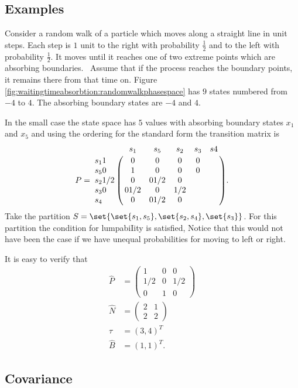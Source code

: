 \documentclass[12pt]{article}
\begin{document}
\subsection*{Examples}

\begin{example}
    Consider a random walk%
    of a particle which moves along a straight line in unit steps.  Each
    step is \( 1 \) unit to the right with probability \( \frac{1}{2} \) and to
    the left with probability \( \frac{1}{2} \).  It moves until it reaches
    one of two extreme points which are absorbing boundaries.~%
    Assume that if the process reaches the boundary points, it remains
    there from that time on.  Figure~%
    \ref{fig:waitingtimeabsorbtion:randomwalkphasespace} has \( 9 \)
    states numbered from \( -4 \) to \( 4 \).  The absorbing boundary
    states are \( -4 \) and \( 4 \).

    In the small case the state space has $5$ values with absorbing
    boundary states $x_1$ and $x_5$ and using the ordering for the
    standard form the transition matrix is
    \[
      P =
      \bordermatrix{
       & s_1 & s_5 & s_2 & s_3 & s4 \cr
      s_1 1 & 0 & 0 & 0 & 0 \cr
      s_5 0 & 1 & 0 & 0 & 0 \cr
      s_2 1/2 & 0 & 0 1/2 & 0 \cr
      s_3 0 & 0 1/2 & 0 & 1/2 \cr
      s_4   & 0 & 0 1/2 & 0 \cr
    }.
  \]
  Take the partition $S = \set{ \set{s_1, s_5}, \set{s_2, s_4},
    \set{s_3}}$.  For  this  partition 
the condition for lumpabiIity is  satisfied, Notice  that this would not 
have  been the case  if we  have  unequal probabilities for  moving
to left or right.

It is easy to verify that
\begin{align*}
   \hat{P} &=
   \begin{pmatrix}
     1 & 0 & 0 \\
     1/2 & 0 & 1/2 \\
     0  & 1  & 0
   \end{pmatrix} \\
  \hat{N} &=
  \begin{pmatrix}
    2 & 1 \\
    2 & 2
  \end{pmatrix} \\
  \hat{\tau} &= (3, 4)^T \\
  \hat{B} &= (1,1)^T.
\end{align*}
\end{example}

\subsection*{Covariance}
\end{document}

